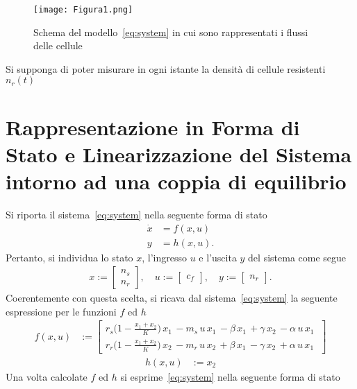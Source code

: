 \documentclass[a4paper, 11pt]{article}
\begin{document}
\begin{figure}[h!]
    \centering
    \texttt{[image: Figura1.png]}
    \caption{Schema del modello~\eqref{eq:system} in cui sono rappresentati i flussi delle cellule}
    \label{fig:enter-label}
\end{figure}

Si supponga di poter misurare in ogni istante la densità di cellule resistenti $n_r(t)$


\clearpage
\section{Rappresentazione in Forma di Stato e Linearizzazione del Sistema intorno ad una coppia di equilibrio}

Si riporta il sistema~\eqref{eq:system} nella seguente forma di stato
%
\begin{subequations}
\begin{align}\label{eq:state_form}
	\dot{x} &= f(x,u)
	\\
	y &= h(x,u).
\end{align}
\end{subequations}
%
Pertanto, si individua lo stato $x$, l'ingresso $u$ e l'uscita $y$ del sistema come segue 
%
\begin{align*}
	x := \begin{bmatrix}
		n_s
		\\
		n_r
	\end{bmatrix}, \quad u := \begin{bmatrix}c_f\end{bmatrix}, \quad y := \begin{bmatrix}n_r\end{bmatrix}.
\end{align*}
%
Coerentemente con questa scelta, si ricava dal sistema~\eqref{eq:system} la seguente espressione per le funzioni $f$ ed $h$
%
\begin{align*}
	f(x,u) &:=\begin{bmatrix}
		 r_s \bigl(1-\frac{x_1+x_2}{K}\bigr)\, x_1\, -m_s\, u\, x_1\, -\beta\, x_1\, +\gamma\, x_2\, -\alpha\, u\, x_1\ 
	\\
	r_r \bigl(1-\frac{x_1+x_2 }{K}\bigr)\, x_2\, -m_r\, u\, x_2\, +\beta\, x_1\, -\gamma\, x_2\, +\alpha\, u\, x_1\ 
	\end{bmatrix}
\end{align*}
\begin{align*}
	h(x,u) &:= x_2
\end{align*}
%
Una volta calcolate $f$ ed $h$ si esprime~\eqref{eq:system} nella seguente forma di stato
\end{document}

